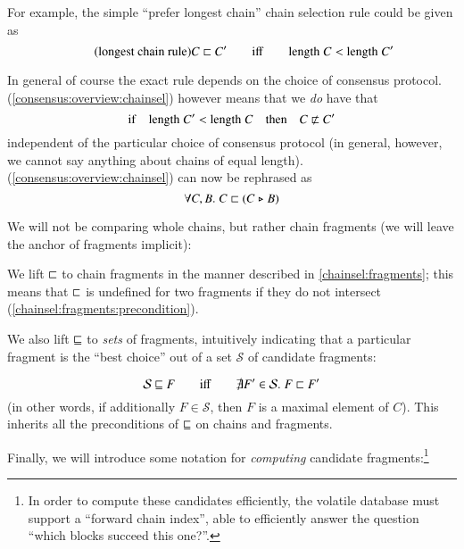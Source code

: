 For example, the simple ``prefer longest chain'' chain selection rule could be
given as
%
\begin{equation*}
\tag{longest chain rule}
C \mathrel{\sqsubset} C'  \qquad\mathrm{iff}\qquad  \mathrm{length} \; C < \mathrm{length} \; C'
\end{equation*}

In general of course the exact rule depends on the choice of consensus protocol.
 (\cref{consensus:overview:chainsel}) however means that we
\emph{do} have that
%
\begin{equation}
\label{eq:never-shrink}
\ifthen{\length{C'} < \length{C}}{C \chainnotlt C'}
\end{equation}
%
independent of the particular choice of consensus protocol (in general, however,
we cannot say anything about chains of equal length). 
(\cref{consensus:overview:chainsel}) can now be rephrased as
%
\begin{equation}
\label{eq:prefer-extension}
\forall C, B .\; C \mathrel{\sqsubset} (C \mathrel{\triangleright} B)
\end{equation}

We will not be comparing whole chains, but rather chain fragments
(we will leave the anchor of fragments implicit):
%
\begin{definition}
We lift $\mathrel{\sqsubset}$ to chain fragments in the manner described in
\cref{chainsel:fragments}; this means that $\mathrel{\sqsubset}$ is undefined for two
fragments if they do not intersect (\cref{chainsel:fragments:precondition}).
\end{definition}

We also lift $\mathrel{\sqsubseteq}$ to \emph{sets} of fragments, intuitively indicating that
a particular fragment is the ``best choice'' out of a set $\mathcal{S}$ of
candidate fragments:
%
\begin{definition}
\begin{equation*}
\mathcal{S} \mathrel{\sqsubseteq} F  \qquad\mathrm{iff}\qquad   \nexists F' \in \mathcal{S} .\; F \mathrel{\sqsubset} F'
\end{equation*}
(in other words, if additionally $F \in \mathcal{S}$, then $F$ is a maximal
element of $C$). This inherits all the preconditions of $\mathrel{\sqsubseteq}$ on chains and
fragments.
\end{definition}

Finally, we will introduce some notation for \emph{computing} candidate
fragments:\footnote{In order to compute these candidates efficiently, the
volatile database must support a ``forward chain index'', able to efficiently
answer the question ``which blocks succeed this one?''.}


